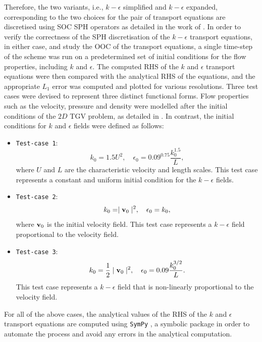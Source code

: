 Therefore, the two variants, i.e., $k-\epsilon$ simplified and $k-\epsilon$ expanded, corresponding to the two choices for the pair of transport equations are discretised using SOC SPH operators as detailed in the work of \cite{Negi2022Techniques}.
In order to verify the correctness of the SPH discretisation of the $k-\epsilon$ transport equations, in either case, and study the OOC of the transport equations, a single time-step of the scheme was run on a predetermined set of initial conditions for the flow properties, including $k$ and $\epsilon$. The computed RHS of the $k$ and $\epsilon$ transport equations were then compared with the analytical RHS of the equations, and the appropriate $L_1$ error was computed and plotted for various resolutions.
Three test cases were devised to represent three distinct functional forms. Flow properties such as the velocity, pressure and density were modelled after the initial conditions of the $2D$ TGV problem, as detailed in . In contrast, the initial conditions for $k$ and $\epsilon$ fields were defined as follows:
\begin{itemize}
  \item \texttt{Test-case 1}:
  \begin{equation}
    k_0 = 1.5 U^2, \quad \epsilon_0 = 0.09^{0.75} \frac{k_0^{1.5}}{L},
  \end{equation}
  where $U$ and $L$ are the characteristic velocity and length scales. This test case represents a constant and uniform initial condition for the $k-\epsilon$ fields.

  \item \texttt{Test-case 2}:
  \begin{equation}
    k_0 = \mid \mathbf{v}_0 \mid^2, \quad \epsilon_0 = k_0,
  \end{equation}
  where $\mathbf{v}_0$ is the initial velocity field. This test case represents a $k-\epsilon$ field proportional to the velocity field.

  \item \texttt{Test-case 3}:
  \begin{equation}
    k_0 = \frac{1}{2}\mid \mathbf{v}_0 \mid^2, \quad \epsilon_0 = 0.09 \frac{k_0^{3/2}}{L}.
  \end{equation}
  This test case represents a $k-\epsilon$ field that is non-linearly proportional to the velocity field.
\end{itemize}
For all of the above cases, the analytical values of the RHS of the $k$ and $\epsilon$ transport equations are computed using \texttt{SymPy} \parencite{Meurer2017}, a symbolic package in order to automate the process and avoid any errors in the analytical computation.

